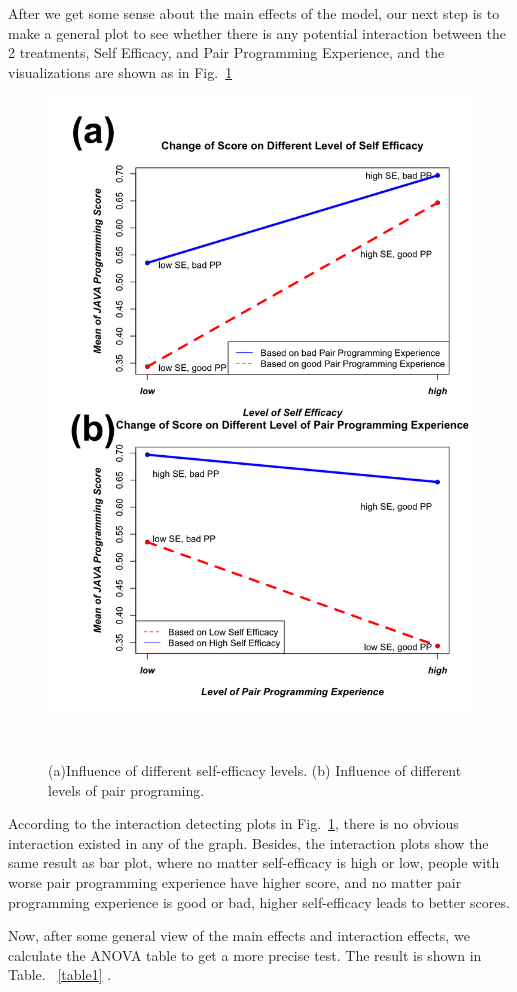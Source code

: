 \documentclass{sigchi}
\begin{document}
After we get some sense about the main effects of the model, our next step is to make a general plot to see whether there is any potential interaction between the 2 treatments, Self Efficacy, and Pair Programming Experience, and the visualizations are shown as in Fig.~\ref{fig:figure4}

\begin{figure}
\centering
  \includegraphics[width=0.8\columnwidth]{figures/fig4}
  \caption{(a)Influence of different self-efficacy levels. (b) Influence of different levels of pair programing.}~\label{fig:figure4}
\end{figure}

According to the interaction detecting plots in Fig.~\ref{fig:figure4}, there is no obvious interaction existed in any of the graph. Besides, the interaction plots show the same result as bar plot, where no matter self-efficacy is high or low, people with worse pair programming experience have higher score, and no matter pair programming experience is good or bad, higher self-efficacy leads to better scores.

Now, after some general view of the main effects and interaction effects, we calculate the ANOVA table to get a more precise test. The result is shown in Table. ~\ref{table1} .
\end{document}

